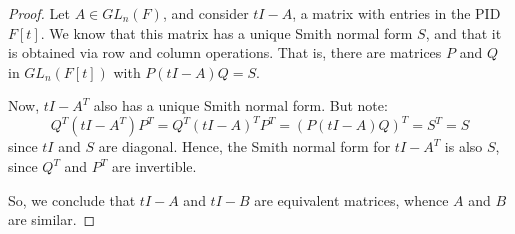 \begin{proof}
	Let $A \in GL_n(F)$, and consider $tI - A$, a matrix with entries in the PID $F[t]$. We know that this matrix has a unique Smith normal form $S$, and that it is obtained via row and column operations. That is, there are matrices $P$ and $Q$ in $GL_n(F[t])$ with $P(tI-A)Q = S$.
	
	Now, $tI-A^T$ also has a unique Smith normal form. But note:
	\[ Q^T(tI-A^T)P^T = Q^T(tI-A)^TP^T = (P(tI-A)Q)^T = S^T = S \]
	since $tI$ and $S$ are diagonal. Hence, the Smith normal form for $tI-A^T$ is also $S$, since $Q^T$ and $P^T$ are invertible.
	
	So, we conclude that $tI-A$ and $tI-B$ are equivalent matrices, whence $A$ and $B$ are similar.
\end{proof}
